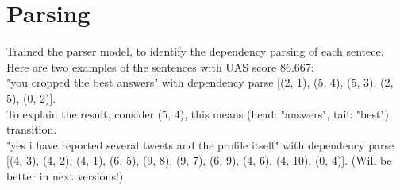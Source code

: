 \documentclass[a4paper]{article}
\begin{document}
\section{Parsing}
Trained the parser model, to identify the dependency parsing of each sentece. Here are two examples of the sentences with UAS score 86.667:\\
"you cropped the best answers" with dependency parse [(2, 1), (5, 4), (5, 3), (2, 5), (0, 2)].\\ 
To explain the result, consider (5, 4), this means (head: "answers", tail: "best") transition.\\
"yes i have reported several tweets and the profile itself" with dependency parse [(4, 3), (4, 2), (4, 1), (6, 5), (9, 8), (9, 7), (6, 9), (4, 6), (4, 10), (0, 4)]. (Will be better in next versions!)
\end{document}
